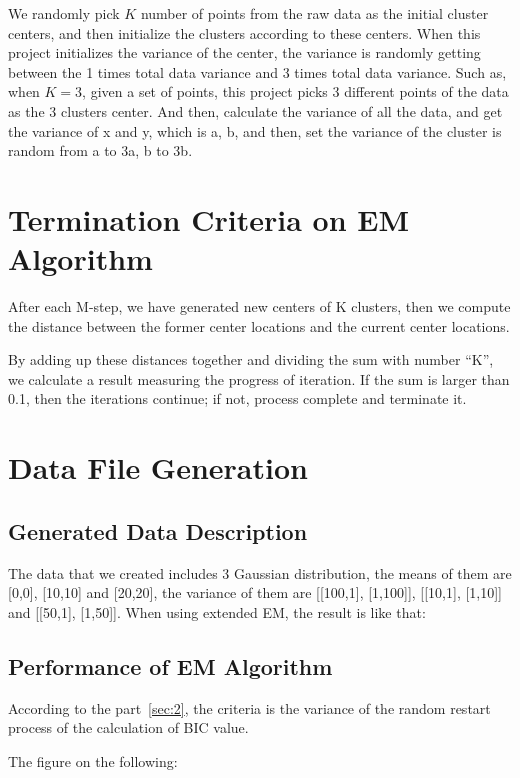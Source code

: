 \documentclass[11pt, a4paper]{article}
\begin{document}
We randomly pick $K$ number of points from the raw data as the initial cluster centers, and then initialize the clusters according to these centers. When this project initializes the variance of the center, the variance is randomly getting between the 1 times total data variance and 3 times total data variance. Such as, when $K=3$,  given a set of points, this project picks 3 different points of the data as the 3 clusters center. And then, calculate the variance of all the data, and get the variance of x and y, which is a, b, and then, set the variance of the cluster is random from a to 3a, b to 3b.

\section{Termination Criteria on EM Algorithm}

After each M-step, we have generated new centers of K clusters, then we compute the distance between the former center locations and the current center locations.

By adding up these distances together and dividing the sum with number “K”, we calculate a result measuring the progress of iteration. If the sum is larger than 0.1, then the iterations continue; if not, process complete and terminate it.

\section{Data File Generation}
\label{sec:5}

\subsection{Generated Data Description}

The data that we created includes 3 Gaussian distribution, the means of them are [0,0], [10,10] and [20,20], the variance of them are [[100,1], [1,100]], [[10,1], [1,10]] and [[50,1], [1,50]].
When using extended EM, the result is like that:

\subsection{Performance of EM Algorithm}

According to the part~\ref{sec:2}, the criteria is the variance of the random restart process of the calculation of BIC value.

The figure on the following:
\end{document}
